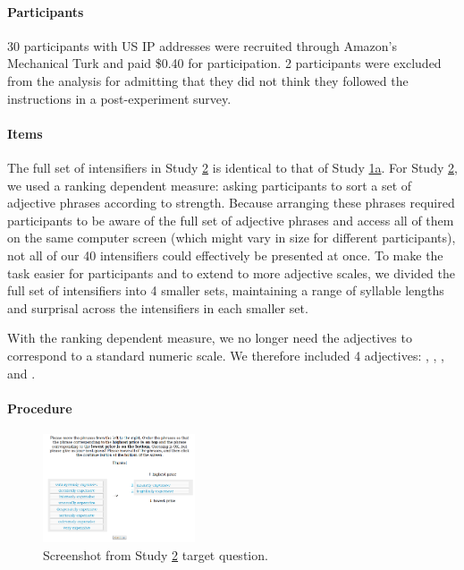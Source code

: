 \paragraph{Participants}

30 participants with US IP addresses were recruited through Amazon's Mechanical Turk and paid \$0.40 for  participation. 2 participants were excluded from the analysis for admitting that they did not think they followed the instructions in a post-experiment survey.

\paragraph{Items}

The full set of intensifiers in Study \hyperref[sec:study2]{2} is identical to that of Study \hyperref[sec:study1a]{1a}. 
For Study \hyperref[sec:study2]{2}, we used a ranking dependent measure: asking participants to sort a set of adjective phrases according to strength.
Because arranging these phrases required participants to be aware of the full set of adjective phrases and access all of them on the same computer screen (which might vary in size for different participants), not all of our 40 intensifiers could effectively be presented at once.
To make the task easier for participants and to extend to more adjective scales, we divided the full set of intensifiers into 4 smaller sets, maintaining a range of syllable lengths and surprisal across the intensifiers in each smaller set.

With the ranking dependent measure, we no longer need the adjectives to correspond to a standard numeric scale.
We therefore included 4 adjectives: , , , and .

\paragraph{Procedure%
}

\begin{figure}[hbt]
\begin{center}
\includegraphics[width=0.4\textwidth]{exp2-q.png}
\end{center}
\caption{Screenshot from Study \hyperref[sec:study2]{2} target question.} 
\label{fig:question_study2}
\end{figure}

